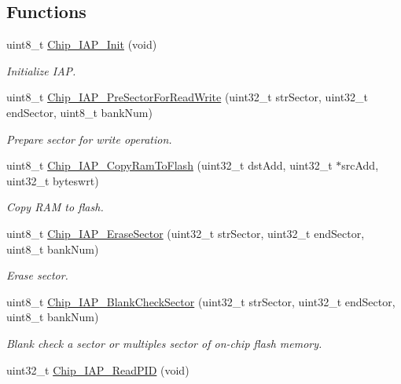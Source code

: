 \subsection*{Functions}
\begin{DoxyCompactItemize}
\item 
uint8\+\_\+t \hyperlink{group___i_a_p__18_x_x__43_x_x_ga85baff5c83b664045cde6e27c56f98a1}{Chip\+\_\+\+I\+A\+P\+\_\+\+Init} (void)
\begin{DoxyCompactList}\small\item\em Initialize I\+AP. \end{DoxyCompactList}\item 
uint8\+\_\+t \hyperlink{group___i_a_p__18_x_x__43_x_x_ga2848906d7dd201adfe74ee0501963f66}{Chip\+\_\+\+I\+A\+P\+\_\+\+Pre\+Sector\+For\+Read\+Write} (uint32\+\_\+t str\+Sector, uint32\+\_\+t end\+Sector, uint8\+\_\+t bank\+Num)
\begin{DoxyCompactList}\small\item\em Prepare sector for write operation. \end{DoxyCompactList}\item 
uint8\+\_\+t \hyperlink{group___i_a_p__18_x_x__43_x_x_ga71cb8cde86dc344b05219cdf1ecee638}{Chip\+\_\+\+I\+A\+P\+\_\+\+Copy\+Ram\+To\+Flash} (uint32\+\_\+t dst\+Add, uint32\+\_\+t $\ast$src\+Add, uint32\+\_\+t byteswrt)
\begin{DoxyCompactList}\small\item\em Copy R\+AM to flash. \end{DoxyCompactList}\item 
uint8\+\_\+t \hyperlink{group___i_a_p__18_x_x__43_x_x_ga6f5e81e121da7eb32a50cd205ca3358f}{Chip\+\_\+\+I\+A\+P\+\_\+\+Erase\+Sector} (uint32\+\_\+t str\+Sector, uint32\+\_\+t end\+Sector, uint8\+\_\+t bank\+Num)
\begin{DoxyCompactList}\small\item\em Erase sector. \end{DoxyCompactList}\item 
uint8\+\_\+t \hyperlink{group___i_a_p__18_x_x__43_x_x_gac740e0af8946c1bbfc04fbbb1c9b95e3}{Chip\+\_\+\+I\+A\+P\+\_\+\+Blank\+Check\+Sector} (uint32\+\_\+t str\+Sector, uint32\+\_\+t end\+Sector, uint8\+\_\+t bank\+Num)
\begin{DoxyCompactList}\small\item\em Blank check a sector or multiples sector of on-\/chip flash memory. \end{DoxyCompactList}\item 
uint32\+\_\+t \hyperlink{group___i_a_p__18_x_x__43_x_x_gaa4b90551649db0627dc195acfc834cbe}{Chip\+\_\+\+I\+A\+P\+\_\+\+Read\+P\+ID} (void)

\end{DoxyCompactItemize}
